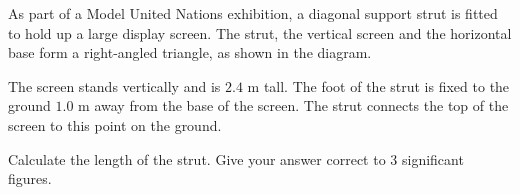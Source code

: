 \begin{question}
\noindent As part of a Model United Nations exhibition, a diagonal support strut is fitted to hold up a large display screen. The strut, the vertical screen and the horizontal base form a right-angled triangle, as shown in the diagram.

The screen stands vertically and is $2.4$ m tall. The foot of the strut is fixed to the ground $1.0$ m away from the base of the screen. The strut connects the top of the screen to this point on the ground.

\begin{center}
\end{center}

\noindent Calculate the length of the strut.
Give your answer correct to 3 significant figures.
\vspace{4.5cm}
\begin{flushright}
\end{flushright}
\end{question}
